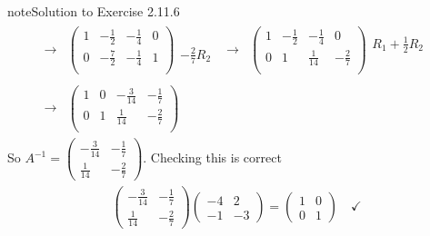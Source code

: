 \documentclass[letterpaper,10pt,english]{jupyterBook}
\begin{document}
\begin{sphinxadmonition}{note}{Solution to Exercise 2.11.6}
\begin{equation*}
\begin{split}
\begin{align*}
    \longrightarrow 
    & \left( \begin{array}{cc|cc} 
         1 & - \frac{1}{2} & - \frac{1}{4} & 0 \\ 
         0 & - \frac{7}{2} & - \frac{1}{4} & 1 \\ 
    \end{array} \right) 
    \begin{array}{l} \phantom{x} \\ - \frac{2}{7} R_{2}\end{array} & 
    \longrightarrow 
    & \left( \begin{array}{cc|cc} 
         1 & - \frac{1}{2} & - \frac{1}{4} & 0 \\ 
         0 & 1 & \frac{1}{14} & - \frac{2}{7} \\ 
    \end{array} \right) 
    \begin{array}{l} R_{1} + \frac{1}{2} R_{2}\\ \phantom{x} \end{array} \\ \\ 
    \longrightarrow 
    & \left( \begin{array}{cc|cc} 
         1 & 0 & - \frac{3}{14} & - \frac{1}{7} \\ 
         0 & 1 & \frac{1}{14} & - \frac{2}{7} \\ 
    \end{array} \right) 
\end{align*} \end{split}
\end{equation*}
\sphinxAtStartPar
So \(A^{-1} = \left(\begin{matrix}- \frac{3}{14} & - \frac{1}{7}\\\frac{1}{14} & - \frac{2}{7}\end{matrix}\right)\). Checking this is correct
\begin{equation*}
\begin{split} \begin{align*} 
    \left(\begin{matrix}- \frac{3}{14} & - \frac{1}{7}\\\frac{1}{14} & - \frac{2}{7}\end{matrix}\right)\left(\begin{matrix}-4 & 2\\-1 & -3\end{matrix}\right) = \left(\begin{matrix}1 & 0\\0 & 1\end{matrix}\right) \quad \checkmark\end{align*} \end{split}

\end{equation*}
\end{sphinxadmonition}
\end{document}
